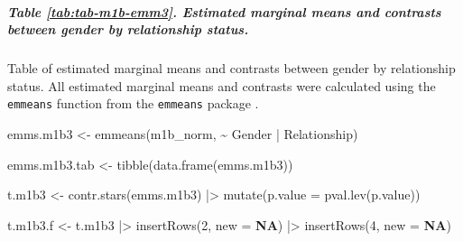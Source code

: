 \documentclass[
  bookmarksnumbered]{article}
\newenvironment{Shaded}{\begin{snugshade}}{\end{snugshade}}
\newcommand{\AttributeTok}[1]{\textcolor[rgb]{0.80,0.80,0.80}{#1}}
\newcommand{\ConstantTok}[1]{\textcolor[rgb]{0.86,0.64,0.64}{\textbf{#1}}}
\newcommand{\DecValTok}[1]{\textcolor[rgb]{0.86,0.86,0.80}{#1}}
\newcommand{\FunctionTok}[1]{\textcolor[rgb]{0.94,0.94,0.56}{#1}}
\newcommand{\NormalTok}[1]{\textcolor[rgb]{0.80,0.80,0.80}{#1}}
\newcommand{\OtherTok}[1]{\textcolor[rgb]{0.94,0.94,0.56}{#1}}
\newcommand{\SpecialCharTok}[1]{\textcolor[rgb]{0.86,0.64,0.64}{#1}}
\begin{document}
\subparagraph{Table \ref{tab:tab-m1b-emm3}. Estimated marginal means and contrasts between gender by relationship status.}\label{table-reftabtab-m1b-emm3.-estimated-marginal-means-and-contrasts-between-gender-by-relationship-status.}

Table of estimated marginal means and contrasts between gender by relationship status. All estimated marginal means and contrasts were calculated using the \texttt{emmeans} function from the \texttt{emmeans} package \autocite{emmeanscit}.

\begin{Shaded}
\begin{Highlighting}[]
\NormalTok{emms.m1b3 }\OtherTok{\textless{}{-}} \FunctionTok{emmeans}\NormalTok{(m1b\_norm, }\SpecialCharTok{\textasciitilde{}}\NormalTok{ Gender }\SpecialCharTok{|}\NormalTok{ Relationship)}

\NormalTok{emms.m1b3.tab }\OtherTok{\textless{}{-}} \FunctionTok{tibble}\NormalTok{(}\FunctionTok{data.frame}\NormalTok{(emms.m1b3))}

\NormalTok{t.m1b3 }\OtherTok{\textless{}{-}} \FunctionTok{contr.stars}\NormalTok{(emms.m1b3) }\SpecialCharTok{|\textgreater{}}
  \FunctionTok{mutate}\NormalTok{(}\AttributeTok{p.value =} \FunctionTok{pval.lev}\NormalTok{(p.value))}

\NormalTok{t.m1b3.f }\OtherTok{\textless{}{-}}\NormalTok{ t.m1b3 }\SpecialCharTok{|\textgreater{}}
  \FunctionTok{insertRows}\NormalTok{(}\DecValTok{2}\NormalTok{, }\AttributeTok{new =} \ConstantTok{NA}\NormalTok{) }\SpecialCharTok{|\textgreater{}}
  \FunctionTok{insertRows}\NormalTok{(}\DecValTok{4}\NormalTok{, }\AttributeTok{new =} \ConstantTok{NA}\NormalTok{)}


\end{Highlighting}
\end{Shaded}
\end{document}
